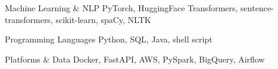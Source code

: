 \begin{cvskills}
  \cvskill
    {Machine Learning \& NLP} %
    {PyTorch, HuggingFace Transformers, sentence-transformers, scikit-learn, spaCy, NLTK} %

  \cvskill
    {Programming Languages} %
    {Python, SQL, Java, shell script} %

  \cvskill
    {Platforms \& Data} %
    {Docker, FastAPI, AWS, PySpark, BigQuery, Airflow} %

\end{cvskills}
